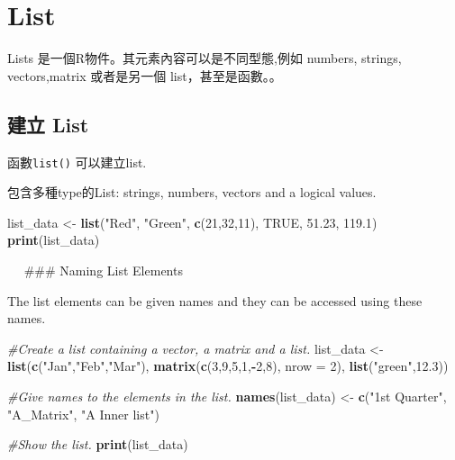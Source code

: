 \documentclass[]{book}
\newenvironment{Shaded}{\begin{snugshade}}{\end{snugshade}}
\newcommand{\KeywordTok}[1]{\textcolor[rgb]{0.13,0.29,0.53}{\textbf{#1}}}
\newcommand{\DataTypeTok}[1]{\textcolor[rgb]{0.13,0.29,0.53}{#1}}
\newcommand{\DecValTok}[1]{\textcolor[rgb]{0.00,0.00,0.81}{#1}}
\newcommand{\FloatTok}[1]{\textcolor[rgb]{0.00,0.00,0.81}{#1}}
\newcommand{\StringTok}[1]{\textcolor[rgb]{0.31,0.60,0.02}{#1}}
\newcommand{\CommentTok}[1]{\textcolor[rgb]{0.56,0.35,0.01}{\textit{#1}}}
\newcommand{\OtherTok}[1]{\textcolor[rgb]{0.56,0.35,0.01}{#1}}
\newcommand{\OperatorTok}[1]{\textcolor[rgb]{0.81,0.36,0.00}{\textbf{#1}}}
\newcommand{\NormalTok}[1]{#1}
\theoremstyle{definition}
\theoremstyle{definition}
\theoremstyle{definition}
\theoremstyle{remark}
\begin{document}
\section{List}\label{list}

Lists 是一個R物件。其元素內容可以是不同型態,例如 numbers, strings,
vectors,matrix 或者是另一個 list，甚至是函數。。

\subsection{建立 List}\label{-list}

函數\texttt{list()} 可以建立list.

包含多種type的List: strings, numbers, vectors and a logical values.

\begin{Shaded}
\begin{Highlighting}[]
\NormalTok{list_data <-}\StringTok{ }\KeywordTok{list}\NormalTok{(}\StringTok{"Red"}\NormalTok{, }\StringTok{"Green"}\NormalTok{, }\KeywordTok{c}\NormalTok{(}\DecValTok{21}\NormalTok{,}\DecValTok{32}\NormalTok{,}\DecValTok{11}\NormalTok{), }\OtherTok{TRUE}\NormalTok{, }\FloatTok{51.23}\NormalTok{, }\FloatTok{119.1}\NormalTok{)}
\KeywordTok{print}\NormalTok{(list_data)}
\end{Highlighting}
\end{Shaded}

　 \#\#\# Naming List Elements

The list elements can be given names and they can be accessed using
these names.

\begin{Shaded}
\begin{Highlighting}[]
\CommentTok{#Create a list containing a vector, a matrix and a list.}
\NormalTok{list_data <-}\StringTok{ }\KeywordTok{list}\NormalTok{(}\KeywordTok{c}\NormalTok{(}\StringTok{"Jan"}\NormalTok{,}\StringTok{"Feb"}\NormalTok{,}\StringTok{"Mar"}\NormalTok{), }\KeywordTok{matrix}\NormalTok{(}\KeywordTok{c}\NormalTok{(}\DecValTok{3}\NormalTok{,}\DecValTok{9}\NormalTok{,}\DecValTok{5}\NormalTok{,}\DecValTok{1}\NormalTok{,}\OperatorTok{-}\DecValTok{2}\NormalTok{,}\DecValTok{8}\NormalTok{), }\DataTypeTok{nrow =} \DecValTok{2}\NormalTok{),}
   \KeywordTok{list}\NormalTok{(}\StringTok{"green"}\NormalTok{,}\FloatTok{12.3}\NormalTok{))}

\CommentTok{#Give names to the elements in the list.}
\KeywordTok{names}\NormalTok{(list_data) <-}\StringTok{ }\KeywordTok{c}\NormalTok{(}\StringTok{"1st Quarter"}\NormalTok{, }\StringTok{"A_Matrix"}\NormalTok{, }\StringTok{"A Inner list"}\NormalTok{)}

\CommentTok{#Show the list.}
\KeywordTok{print}\NormalTok{(list_data)}
\end{Highlighting}
\end{Shaded}
\end{document}
